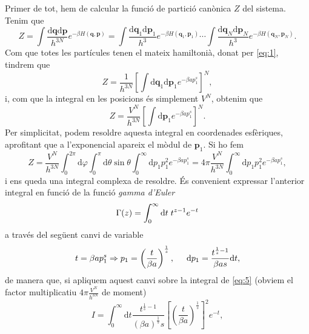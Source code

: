 \documentclass[a4paper, 10pt]{article}
\begin{document}
Primer de tot, hem de calcular la funció de partició canònica $Z$ del sistema. Tenim que
\begin{equation}
	Z = \int \frac{\mathrm{d}\textbf{q}\mathrm{d}\textbf{p}}{h^{3N}}e^{-\beta H(\textbf{q},\textbf{p})} = \int \frac{\mathrm{d}\textbf{q}_1\mathrm{d}\textbf{p}_1}{h^{3}}e^{-\beta H(\textbf{q}_1,\textbf{p}_1)} \cdots \int \frac{\mathrm{d}\textbf{q}_N\mathrm{d}\textbf{p}_N}{h^{3}}e^{-\beta H(\textbf{q}_N,\textbf{p}_N)}. 
\end{equation}
Com que totes les partícules tenen el mateix hamiltonià, donat per \eqref{eq:1}, tindrem que 
\begin{equation}
	Z = \frac{1}{h^{3N}} \left[ \int \mathrm{d}\textbf{q}_1\mathrm{d}\textbf{p}_1e^{-\beta ap_1^s}\right]^N,
\end{equation}
i, com que la integral en les posicions és simplement $V^N$, obtenim que
\begin{equation}
	Z = \frac{V^N}{h^{3N}} \left[ \int \mathrm{d}\textbf{p}_1e^{-\beta ap_1^s}\right]^N.
\end{equation}
Per simplicitat, podem resoldre aquesta integral en coordenades esfèriques, aprofitant que a l'exponencial apareix el mòdul de $\textbf{p}_1$. Si ho fem 
\begin{equation}
	Z = \frac{V^N}{h^{3N}} \int_0^{2\pi} \mathrm{d}\varphi \int_0^\pi \mathrm{d}\theta \sin\theta \int_{0}^{\infty}\mathrm{d}p_1 p_1^2 e^{-\beta a p_1^s} = 4\pi\frac{V^N}{h^{3N}} \int_{0}^{\infty}\mathrm{d}p_1 p_1^2 e^{-\beta a p_1^s}, \label{eq:5}
\end{equation}
i ens queda una integral complexa de resoldre. És convenient expressar l'anterior integral en funció de la funció \textit{gamma d'Euler}
\begin{equation}
	\Gamma(z) = \int_0^{\infty}\mathrm{d}t\hspace{0.1cm}t^{z-1}e^{-t} \label{eq:6}
\end{equation}
a través del següent canvi de variable
\begin{equation*}
	t = \beta a p_1^s\Rightarrow p_1 = \left(\frac{t}{\beta a}\right)^{\frac{1}{s}}, \hspace{0.5cm} \mathrm{d}p_1 = \frac{t^{\frac{1}{s}-1}}{\beta a s}\mathrm{d}t,
\end{equation*}
de manera que, si apliquem aquest canvi sobre la integral de \eqref{eq:5} (obviem el factor multiplicatiu $4\pi \frac{V^N}{h^{3N}}$ de moment)
\begin{equation*}
	I = \int_0^{\infty} \mathrm{d}t\frac{t^{\frac{1}{s}-1}}{(\beta a)^\frac{1}{s} s} \left[\left(\frac{t}{\beta a}\right)^{\frac{1}{s}}\right]^2e^{-t},
\end{equation*}
\end{document}

